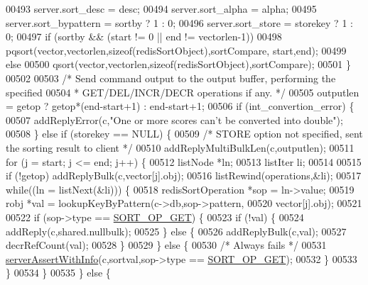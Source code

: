 \begin{DoxyCode}
00493         server.sort\_desc = desc;
00494         server.sort\_alpha = alpha;
00495         server.sort\_bypattern = sortby ? 1 : 0;
00496         server.sort\_store = storekey ? 1 : 0;
00497         \textcolor{keywordflow}{if} (sortby && (start != 0 || end != vectorlen-1))
00498             pqsort(vector,vectorlen,\textcolor{keyword}{sizeof}(redisSortObject),sortCompare, start,end);
00499         \textcolor{keywordflow}{else}
00500             qsort(vector,vectorlen,\textcolor{keyword}{sizeof}(redisSortObject),sortCompare);
00501     \}
00502 
00503     \textcolor{comment}{/* Send command output to the output buffer, performing the specified}
00504 \textcolor{comment}{     * GET/DEL/INCR/DECR operations if any. */}
00505     outputlen = getop ? getop*(end-start+1) : end-start+1;
00506     \textcolor{keywordflow}{if} (int\_convertion\_error) \{
00507         addReplyError(c,\textcolor{stringliteral}{"One or more scores can't be converted into double"});
00508     \} \textcolor{keywordflow}{else} \textcolor{keywordflow}{if} (storekey == NULL) \{
00509         \textcolor{comment}{/* STORE option not specified, sent the sorting result to client */}
00510         addReplyMultiBulkLen(c,outputlen);
00511         \textcolor{keywordflow}{for} (j = start; j <= end; j++) \{
00512             listNode *ln;
00513             listIter li;
00514 
00515             \textcolor{keywordflow}{if} (!getop) addReplyBulk(c,vector[j].obj);
00516             listRewind(operations,&li);
00517             \textcolor{keywordflow}{while}((ln = listNext(&li))) \{
00518                 redisSortOperation *sop = ln->value;
00519                 robj *val = lookupKeyByPattern(c->db,sop->pattern,
00520                     vector[j].obj);
00521 
00522                 \textcolor{keywordflow}{if} (sop->type == \hyperlink{server_8h_ae9b61d5c032be6ac2f29076ee43cef8b}{SORT\_OP\_GET}) \{
00523                     \textcolor{keywordflow}{if} (!val) \{
00524                         addReply(c,shared.nullbulk);
00525                     \} \textcolor{keywordflow}{else} \{
00526                         addReplyBulk(c,val);
00527                         decrRefCount(val);
00528                     \}
00529                 \} \textcolor{keywordflow}{else} \{
00530                     \textcolor{comment}{/* Always fails */}
00531                     \hyperlink{server_8h_a7308f76cbff9a8d3797fe78190b91282}{serverAssertWithInfo}(c,sortval,sop->type == 
      \hyperlink{server_8h_ae9b61d5c032be6ac2f29076ee43cef8b}{SORT\_OP\_GET});
00532                 \}
00533             \}
00534         \}
00535     \} \textcolor{keywordflow}{else} \{

\end{DoxyCode}
